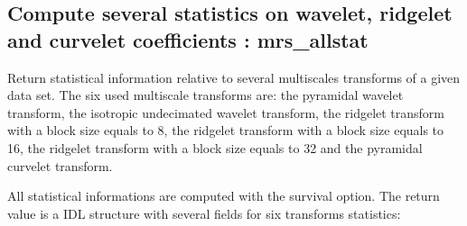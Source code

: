\subsection{Compute several statistics on wavelet, ridgelet and curvelet coefficients : mrs\_allstat}
Return statistical information relative to several multiscales transforms of a given data set. The six used multiscale transforms are: 
the pyramidal wavelet transform, the isotropic undecimated wavelet transform, the ridgelet transform with a block size equals to 8, 
the ridgelet transform with a block size equals to 16, the ridgelet transform with a block size equals to 32 and the pyramidal curvelet transform.

All statistical informations are computed with the survival option. The return value is a IDL structure with several fields for six transforms statistics:


